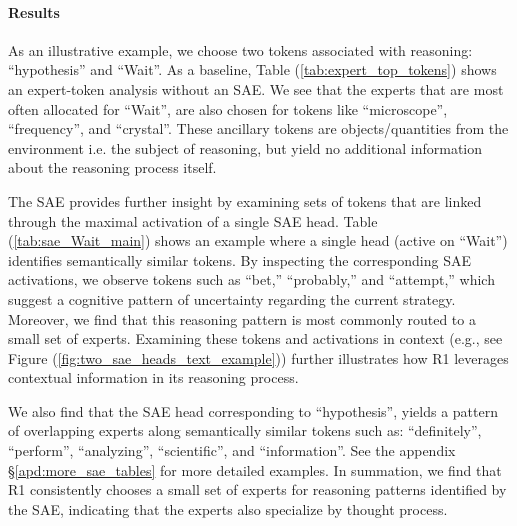 \paragraph{Results}

As an illustrative example, we choose two tokens associated with reasoning: ``hypothesis'' and ``Wait''. As a baseline, Table (\ref{tab:expert_top_tokens}) shows an expert-token analysis without an SAE. We see that the experts that are most often allocated for ``Wait'', are also chosen for tokens like ``microscope'', ``frequency'', and ``crystal''. These ancillary tokens are objects/quantities from the environment i.e. the subject of reasoning, but yield no additional information about the reasoning process itself. %



The SAE provides further insight by examining sets of tokens that are linked through the maximal activation of a single SAE head. 
Table (\ref{tab:sae_Wait_main}) shows an example where a single head (active on “Wait”) identifies semantically similar tokens. By inspecting the corresponding SAE activations, we observe tokens such as “bet,” “probably,” and “attempt,” which suggest a cognitive pattern of uncertainty regarding the current strategy. Moreover, we find that this reasoning pattern is most commonly routed to a small set of experts. Examining these tokens and activations in context (e.g., see Figure (\ref{fig:two_sae_heads_text_example})) further illustrates how R1 leverages contextual information in its reasoning process.


We also find that the SAE head corresponding to ``hypothesis'', yields a pattern of overlapping experts along semantically similar tokens such as: ``definitely'', ``perform'', ``analyzing'', ``scientific'', and ``information''. See the appendix \S\ref{apd:more_sae_tables} for more detailed examples. In summation, we find that R1 consistently chooses a small set of experts for reasoning patterns identified by the SAE, indicating that the experts also specialize by thought process.  




